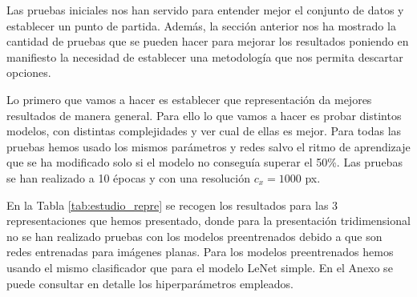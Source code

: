 \documentclass[a4paper,12pt,twoside,titlepage]{article}
\begin{document}
Las pruebas iniciales nos han servido para entender mejor el conjunto de datos y establecer un punto de partida. Además, la sección anterior nos ha mostrado la cantidad de pruebas que se pueden hacer para mejorar los resultados poniendo en manifiesto la necesidad de establecer una metodología que nos permita descartar opciones.

Lo primero que vamos a hacer es establecer que representación da mejores resultados de manera general. Para ello lo que vamos a hacer es probar distintos modelos, con distintas complejidades y ver cual de ellas es mejor. Para todas las pruebas hemos usado los mismos parámetros y redes salvo el ritmo de aprendizaje que se ha modificado solo si el modelo no conseguía superar el 50\%. Las pruebas se han realizado a 10 épocas y con una resolución $c_x = 1000$ px.

En la Tabla \ref{tab:estudio_repre} se recogen los resultados para las 3 representaciones que hemos presentado, donde para la presentación tridimensional no se han realizado pruebas con los modelos preentrenados debido a que son redes entrenadas para imágenes planas. Para los modelos preentrenados hemos usando el mismo clasificador que para el modelo LeNet simple. En el Anexo se puede consultar en detalle los hiperparámetros empleados.
\end{document}
